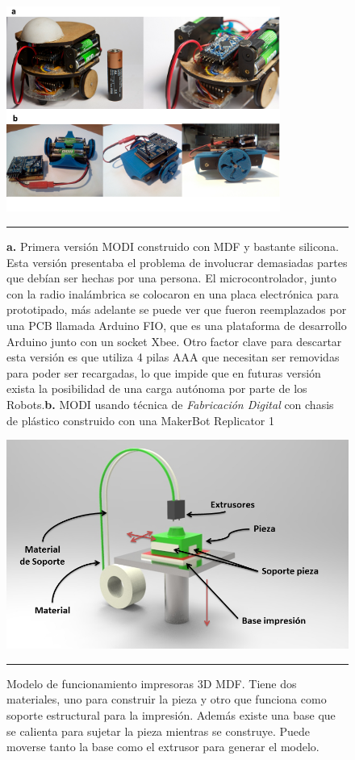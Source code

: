 \begin{figure}[htbp]
	\centering
		\includegraphics[width=0.8\textwidth]{./Pictures/modi_analogToDigital.png}
		\rule{35em}{0.5pt}
	\caption[Comparación de construcción análoga y digital]{\textbf{a.} Primera versión MODI construido con MDF y bastante silicona. Esta versión presentaba el problema de involucrar demasiadas partes que debían ser hechas por una persona. El microcontrolador, junto con la radio inalámbrica se colocaron en una placa electrónica para prototipado, más adelante se puede ver que fueron reemplazados por una PCB llamada Arduino FIO, que es una plataforma de desarrollo Arduino junto con un socket Xbee. Otro factor clave para descartar esta versión es que utiliza 4 pilas AAA que necesitan ser removidas para poder ser recargadas, lo que impide que en futuras versión exista la posibilidad de una carga autónoma por parte de los Robots.\textbf{b.} MODI usando técnica de \emph{ Fabricación Digital }con chasis de plástico construido con una MakerBot Replicator 1}
	\label{fig:analgTodigital}
\end{figure}

\begin{figure}[htbp]
	\centering
		\includegraphics[width=\textwidth]{./Figures/3Dprint.png}
		\rule{35em}{0.5pt}
	\caption[Modelo funcionamiento Impresora 3D]{Modelo de funcionamiento impresoras 3D MDF. Tiene dos materiales, uno para construir la pieza y otro que funciona como soporte estructural para la impresión. Además existe una base que se calienta para sujetar la pieza mientras se construye. Puede moverse tanto la base como el extrusor para generar el modelo.}
	\label{fig:3Dprint}
\end{figure}	



